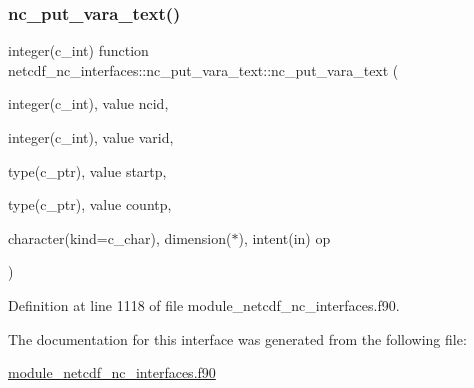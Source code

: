 \subsubsection{\texorpdfstring{nc\+\_\+put\+\_\+vara\+\_\+text()}{nc\_put\_vara\_text()}}
{\footnotesize\ttfamily integer(c\+\_\+int) function netcdf\+\_\+nc\+\_\+interfaces\+::nc\+\_\+put\+\_\+vara\+\_\+text\+::nc\+\_\+put\+\_\+vara\+\_\+text (\begin{DoxyParamCaption}\item[{integer(c\+\_\+int), value}]{ncid,  }\item[{integer(c\+\_\+int), value}]{varid,  }\item[{type(c\+\_\+ptr), value}]{startp,  }\item[{type(c\+\_\+ptr), value}]{countp,  }\item[{character(kind=c\+\_\+char), dimension($\ast$), intent(in)}]{op }\end{DoxyParamCaption})}



Definition at line 1118 of file module\+\_\+netcdf\+\_\+nc\+\_\+interfaces.\+f90.



The documentation for this interface was generated from the following file\+:\begin{DoxyCompactItemize}
\item 
\hyperlink{module__netcdf__nc__interfaces_8f90}{module\+\_\+netcdf\+\_\+nc\+\_\+interfaces.\+f90}\end{DoxyCompactItemize}
